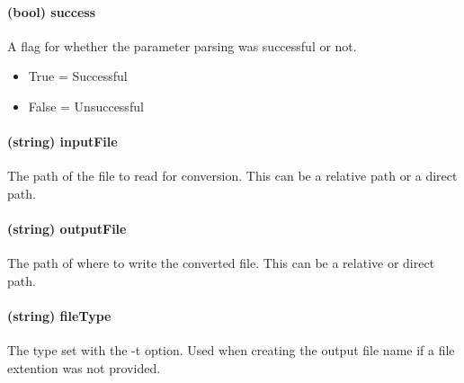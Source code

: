         \paragraph{(bool) success}
            A flag for whether the parameter parsing was successful or not.
            \begin{itemize}
                \item True = Successful
                \item False = Unsuccessful
            \end{itemize}

        \paragraph{(string) inputFile}
            The path of the file to read for conversion.  This can be a relative path or a direct path.
        
        \paragraph{(string) outputFile}
            The path of where to write the converted file.  This can be a relative or direct path.
        
        \paragraph{(string) fileType}
            The type set with the -t option.  Used when creating the output file name if a file extention was not provided.
            